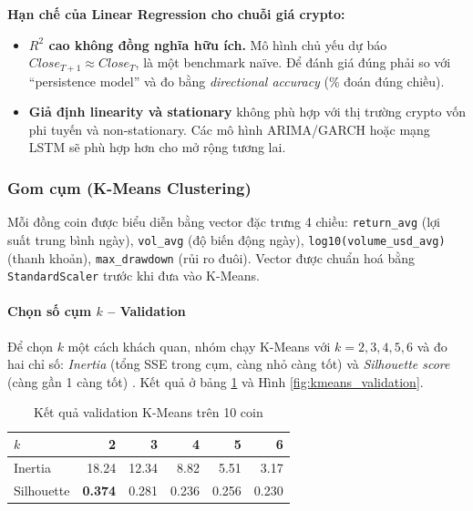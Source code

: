 \textbf{Hạn chế của Linear Regression cho chuỗi giá crypto:}
\begin{itemize}
    \item \textbf{$R^2$ cao không đồng nghĩa hữu ích.} Mô hình chủ yếu dự báo $Close_{T+1} \approx Close_T$, là một benchmark naïve. Để đánh giá đúng phải so với ``persistence model'' và đo bằng \emph{directional accuracy} (\% đoán đúng chiều).
    \item \textbf{Giả định linearity và stationary} không phù hợp với thị trường crypto vốn phi tuyến và non-stationary. Các mô hình ARIMA/GARCH \cite{hyndman2021} hoặc mạng LSTM sẽ phù hợp hơn cho mở rộng tương lai.
\end{itemize}

\subsubsection{Gom cụm (K-Means Clustering)}

Mỗi đồng coin được biểu diễn bằng vector đặc trưng 4 chiều: \texttt{return\_avg} (lợi suất trung bình ngày), \texttt{vol\_avg} (độ biến động ngày), \texttt{log10(volume\_usd\_avg)} (thanh khoản), \texttt{max\_drawdown} (rủi ro đuôi). Vector được chuẩn hoá bằng \texttt{StandardScaler} \cite{scikit2023} trước khi đưa vào K-Means.

\paragraph{Chọn số cụm $k$ -- Validation}

Để chọn $k$ một cách khách quan, nhóm chạy K-Means với $k = 2, 3, 4, 5, 6$ và đo hai chỉ số: \emph{Inertia} (tổng SSE trong cụm, càng nhỏ càng tốt) và \emph{Silhouette score} (càng gần 1 càng tốt) \cite{abonyi2007}. Kết quả ở bảng \ref{tab:kmeans_validation} và Hình \ref{fig:kmeans_validation}.

\begin{table}[H]
\centering
\caption{Kết quả validation K-Means trên 10 coin}
\label{tab:kmeans_validation}
\small
\begin{tabular}{@{}lrrrrr@{}}
\toprule
$k$ & 2 & 3 & 4 & 5 & 6 \\ \midrule
Inertia      & 18.24 & 12.34 & 8.82 & 5.51 & 3.17 \\
Silhouette   & \textbf{0.374} & 0.281 & 0.236 & 0.256 & 0.230 \\ \bottomrule
\end{tabular}
\end{table}


